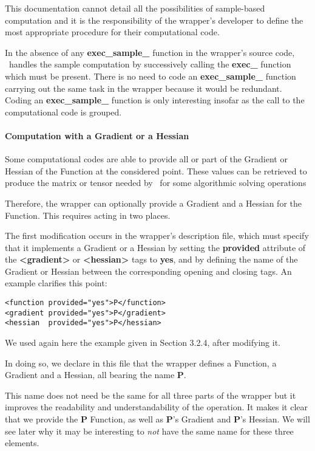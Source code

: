This documentation cannot detail all the possibilities of sample-based computation and it is the responsibility of the wrapper's developer to define the most appropriate procedure for their computational code.

In the absence of any {\bf exec\_sample\_} function in the wrapper's source code, \OT\ handles the sample computation by successively calling the {\bf exec\_} function which must be present. There is no need to code an {\bf exec\_sample\_} function carrying out the same task in the wrapper because it would be redundant. Coding an {\bf exec\_sample\_} function is only interesting insofar as the call to the computational code is grouped.

\paragraph{Computation with a Gradient or a Hessian}

Some computational codes are able to provide all or part of the Gradient or Hessian of the Function at the considered point. These values can be retrieved to produce the matrix or tensor needed by \OT\ for some algorithmic solving operations%

Therefore, the wrapper can optionally provide a Gradient and a Hessian for the Function. This requires acting in two places.

The first modification occurs in the wrapper's description file, which must specify that it implements a Gradient or a Hessian by setting the {\bf provided} attribute of the {\bf <gradient>} or {\bf <hessian>} tags to {\bf yes}, and by defining the name of the Gradient or Hessian between the corresponding opening and closing tags. An example clarifies this point:

\lstset{language=XML, basicstyle=\normalsize}
\begin{lstlisting}[frame=TBRL]
<function provided="yes">P</function>
<gradient provided="yes">P</gradient>
<hessian  provided="yes">P</hessian>
\end{lstlisting}

We used again here the example given in Section 3.2.4, after modifying it.

In doing so, we declare in this file that the wrapper defines a Function, a Gradient and a Hessian, all bearing the name {\bf P}.

This name does not need be the same for all three parts of the wrapper but it improves the readability and understandability of the operation. It makes it clear that we provide the {\bf P} Function, as well as {\bf P}'s Gradient and {\bf P}'s Hessian. We will see later why it may be interesting to \emph{not} have the same name for these three elements.

